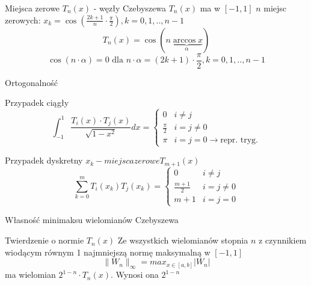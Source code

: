 \begin{frame}{Miejsca zerowe $T_n(x)$ - węzły Czebyszewa}
	$T_n(x)$ ma w $[-1,1]$ $n$ miejsc zerowych:\newline
    $x_k = \cos (\frac{2k+1}{n} \cdot \frac{\pi}{2}), k=0,1,..,n-1$
    $$T_n(x) = \cos(n \underbrace{\arccos x}_\alpha)$$
    $$\cos(n \cdot \alpha) = 0 \text{ dla } n \cdot \alpha = (2k+1) \cdot \frac{\pi}{2},k=0,1,..,n-1$$
\end{frame}
\begin{frame}{Ortogonalność}
	\begin{block}{Przypadek ciągły}
		$$\int_{-1}^{1}\frac{T_i(x) \cdot T_j(x)}{\sqrt{1-x^2}}dx = \left\{\begin{array}{lc}
			0 & i \not= j \\
            \frac{\pi}{2} & i = j \not= 0 \\
            \pi & i = j = 0 \rightarrow \text{repr. tryg.}
		\end{array}\right.$$
	\end{block}
    
    \begin{block}{Przypadek dyskretny $x_k - miejsca zerowe T_{m+1}(x)$}
    $$\sum_{k=0}^{m}T_i(x_k)T_j(x_k) = \left\{\begin{array}{rc}
    	0 & i \not= j \\
        \frac{m+1}{2} & i=j \not= 0 \\
        m+1 & i=j=0
    \end{array}\right.$$
    \end{block}
\end{frame}
\begin{frame}{Własność minimaksu wielomianów Czebyszewa}
	\begin{block}{Twierdzenie o normie $T_n(x)$}
		Ze wszystkich wielomianów stopnia $n$ z czynnikiem wiodącym równym 1 najmniejszą normę maksymalną w $[-1,1]$ 
        $$\lVert W_n \rVert _{\infty} = max_{x \in [a,b]}|W_n|$$
        ma wielomian $2^{1-n} \cdot T_n(x)$. Wynosi ona $2^{1-n}$
	\end{block}
\end{frame}
